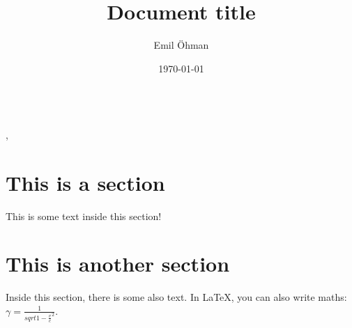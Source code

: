 \documentclass[a4paper]{article}
\title{Document title}
\author{Emil Öhman}
\date{\today}
\begin{document}
\thispagestyle{plain} %

\makeatletter
\noindent\huge{\textbf{\@title}}\vspace{0.33em}\\
\Large{\@author, \@date}\normalsize
\makeatother

\tableofcontents

\section{This is a section}
This is some text inside this section!

\section{This is another section}
Inside this section, there is some also text. In \LaTeX, you can also write maths: \(\gamma=\frac{1}{sqrt{1-{\frac{v}{c}}^2}}\).
\end{document}

